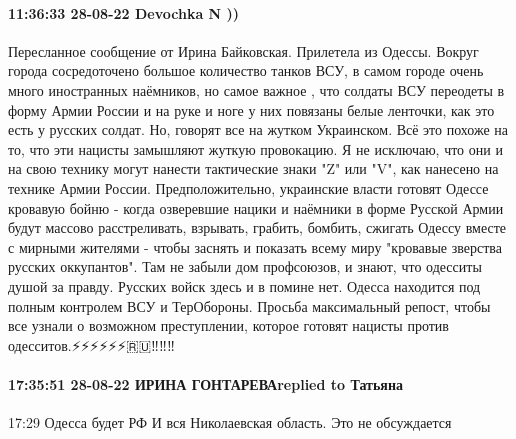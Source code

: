  
 
 
 
 

\paragraph{11:36:33 28-08-22 Devochka N ))}

Пересланное сообщение от Ирина Байковская. Прилетела из Одессы.
Вокруг города сосредоточено большое количество танков ВСУ, в самом городе очень много иностранных наёмников, но самое важное , что солдаты ВСУ переодеты в форму Армии России и на руке и ноге у них повязаны белые ленточки, как это есть у русских солдат. Но, говорят все на жутком Украинском.
Всё это похоже на то, что эти нацисты замышляют жуткую провокацию. Я не исключаю, что они и на свою технику могут нанести тактические знаки "Z" или "V", как нанесено на технике Армии России.
Предположительно, украинские власти готовят Одессе кровавую бойню - когда озверевшие нацики и наёмники в форме Русской Армии будут массово расстреливать, взрывать, грабить, бомбить, сжигать Одессу вместе с мирными жителями - чтобы заснять и показать всему миру "кровавые зверства русских оккупантов". Там не забыли дом профсоюзов, и знают, что одесситы душой за правду.
Русских войск здесь и в помине нет. Одесса находится под полным контролем ВСУ и ТерОбороны.
Просьба максимальный репост, чтобы все узнали о возможном преступлении, которое готовят нацисты против одесситов.⚡️⚡️⚡️⚡️⚡️⚡️🇷🇺‼️‼️‼

\paragraph{17:35:51 28-08-22 ИРИНА ГОНТАРЕВАreplied to Татьяна}
17:29
Одесса будет РФ
И вся Николаевская область.
Это не обсуждается

